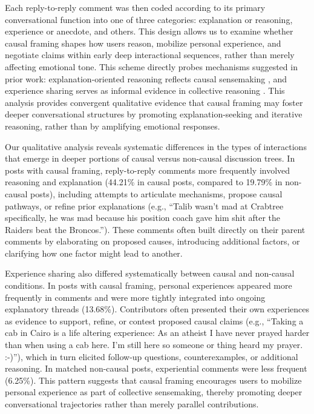 \documentclass[acmsmall]{acmart}
\begin{document}
Each reply-to-reply comment was then coded according to its primary conversational function into one of three categories: explanation or reasoning, experience or anecdote, and others. This design allows us to examine whether causal framing shapes how users reason, mobilize personal experience, and negotiate claims within early deep interactional sequences, rather than merely affecting emotional tone. This scheme directly probes mechanisms suggested in prior work: explanation-oriented reasoning reflects causal sensemaking \cite{lombrozo2006structure}, and experience sharing serves as informal evidence in collective reasoning \cite{pennington1992explaining, zhang2018characterizing}. This analysis provides convergent qualitative evidence that causal framing may foster deeper conversational structures by promoting explanation-seeking and iterative reasoning, rather than by amplifying emotional responses.


Our qualitative analysis reveals systematic differences in the types of interactions that emerge in deeper portions of causal versus non-causal discussion trees. In posts with causal framing, reply-to-reply comments more frequently involved reasoning and explanation (44.21\% in causal posts, compared to  19.79\% in non-causal posts), including attempts to articulate mechanisms, propose causal pathways, or refine prior explanations (e.g., ``Talib wasn't mad at Crabtree specifically, he was mad because his position coach gave him shit after the Raiders beat the Broncos.”). These comments often built directly on their parent comments by elaborating on proposed causes, introducing additional factors, or clarifying how one factor might lead to another.


Experience sharing also differed systematically between causal and non-causal conditions. In posts with causal framing, personal experiences appeared more frequently in comments and were more tightly integrated into ongoing explanatory threads  (13.68\%). Contributors often presented their own experiences as evidence to support, refine, or contest proposed causal claims (e.g., ``Taking a cab in Cairo is a life altering experience: As an atheist I have never prayed harder than when using a cab here. I'm still here so someone or thing heard my prayer. :-)”), which in turn elicited follow-up questions, counterexamples, or additional reasoning. In matched non-causal posts, experiential comments were less frequent (6.25\%). This pattern suggests that causal framing encourages users to mobilize personal experience as part of collective sensemaking, thereby promoting deeper conversational trajectories rather than merely parallel contributions.
\end{document}
